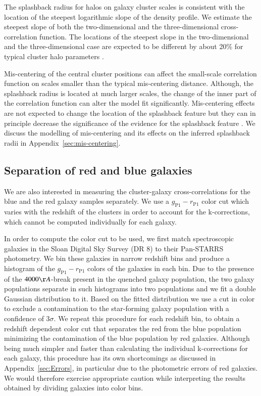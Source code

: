 \documentclass[iop, apjl, twocolappendix, numberedappendix]{emulateapj}
\begin{document}
The splashback radius for halos on galaxy cluster scales is consistent
with the location of the steepest logarithmic slope of the density
profile. We estimate the steepest slope of both the two-dimensional
and the three-dimensional cross-correlation function. The
locations of the steepest slope in the two-dimensional and the
three-dimensional case are expected to be different by
about 20\% for typical cluster halo parameters
\citep{diemer2014dependence, more2016detection}.

Mis-centering of the central cluster positions can affect the
small-scale correlation function on scales smaller than the typical
mis-centering distance.  Although, the splashback radius is located at
much larger scales, the change of the inner part of the correlation
function can alter the model fit significantly.  Mis-centering effects
are not expected to change the location of the splashback feature but
they can in principle decrease the significance of the evidence for
the splashback feature \citep{baxter2017halo}.  We discuss the
modelling of mis-centering and its effects on the inferred splashback
radii in Appendix~\ref{sec:mis-centering}.

\subsection{Separation of red and blue galaxies}
\label{sec:Color}

We are also interested in measuring the cluster-galaxy
cross-correlations for the blue and the red galaxy samples
separately. We use a $g_{\mathrm{P1}}-r_{\mathrm{P1}}$ color cut
which varies with the redshift of the clusters in order to account
for the k-corrections, which cannot be computed individually for
each galaxy.

In order to compute the color cut to be used, we first match spectroscopic
galaxies in the Sloan Digital Sky Survey (DR 8) to their
Pan-STARRS photometry. We bin these galaxies in narrow redshift bins and
produce a histogram of the $g_{\mathrm{P1}}-r_{\mathrm{P1}}$ colors of the
galaxies in each bin. Due to the presence of the $4000\AA$-break present in the
quenched galaxy population, the two galaxy populations separate in such histograms
into two populations and we fit a double Gaussian distribution to it.
Based on the fitted distribution we use a cut in color to exclude a
contamination to the star-forming galaxy population with a confidence
of 3$\sigma$. We repeat this procedure for each redshift bin, to obtain a redshift
dependent color cut that separates the red from the blue population minimizing
the contamination of the blue population by red galaxies. Although being much
simpler and faster than calculating the individual k-corrections for each
galaxy, this procedure has its own shortcomings as discussed in
Appendix~\ref{sec:Errors}, in particular due to the photometric errors of red
galaxies. We would therefore exercise appropriate caution while interpreting
the results obtained by dividing galaxies into color bins.
\end{document}
